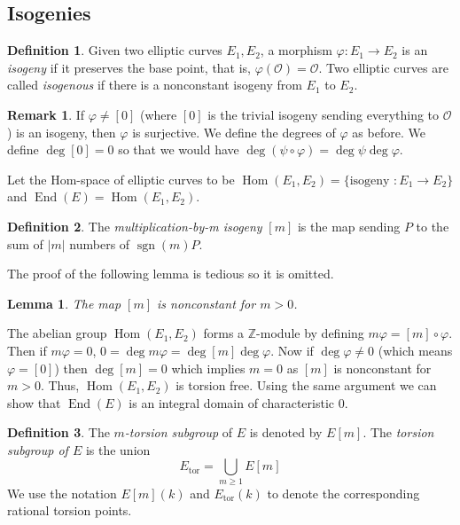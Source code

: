 \documentclass[12pt]{article}
\newtheorem{lemma}{Lemma}[subsection]
\theoremstyle{remark}
\theoremstyle{definition}
\newtheorem{remark}{Remark}[subsection]
\newtheorem{definition}{Definition}[subsection]
\newcommand{\Z}[0]{\mathbb{Z}}
\newcommand{\ecO}[0]{\mathcal O}
\newcommand{\sgn}[0]{\operatorname{sgn}}
\newcommand{\Hom}[0]{\operatorname{Hom}}
\newcommand{\End}[0]{\operatorname{End}}
\begin{document}
        \subsection{Isogenies}    
        \begin{definition}
            Given two elliptic curves $E_1,E_2$, a morphism $\varphi:E_1\to E_2$ is an \textit{isogeny} if it preserves the base point, that is, $\varphi(\ecO)=\ecO$. Two elliptic curves are called \textit{isogenous} if there is a nonconstant isogeny from $E_1$ to $E_2$.
        \end{definition}
        \begin{remark}
            If $\varphi\neq[0]$ (where $[0]$ is the trivial isogeny sending everything to $\ecO$) is an isogeny, then $\varphi$ is surjective. We define the degrees of $\varphi$ as before. We define $\deg[0]=0$ so that we would have $\deg(\psi\circ\varphi)=\deg\psi\deg\varphi$.
        \end{remark}
        Let the Hom-space of elliptic curves to be $\Hom(E_1,E_2)=\{\text{isogeny }:E_1\to E_2\}$ and $\operatorname{End}(E)=\Hom(E_1,E_2)$.
        \begin{definition}
            The \textit{multiplication-by-m isogeny} $[m]$ is the map sending $P$ to the sum of $|m|$ numbers of $\sgn(m)P$.
        \end{definition}
        The proof of the following lemma is tedious so it is omitted.
        \begin{lemma}
            The map $[m]$ is nonconstant for $m>0$.
        \end{lemma}
        The abelian group $\Hom(E_1, E_2)$ forms a $\Z$-module by defining $m\varphi=[m]\circ\varphi$. Then if $m\varphi=0$, $0=\deg m\varphi=\deg[m]\deg\varphi$. Now if $\deg\varphi\neq 0$ (which means $\varphi=[0]$) then $\deg[m]=0$ which implies $m=0$ as $[m]$ is nonconstant for $m>0$. Thus, $\Hom(E_1,E_2)$ is torsion free. Using the same argument we can show that $\End(E)$ is an integral domain of characteristic $0$.
        \begin{definition}
            The \textit{$m$-torsion subgroup} of $E$ is denoted by $E[m]$. The \textit{torsion subgroup of $E$} is the union
            \[E_{\text{tor}}=\bigcup_{m\geqslant 1}E[m]\]
            We use the notation $E[m](k)$ and $E_{\text{tor}}(k)$ to denote the corresponding rational torsion points.
        \end{definition}
\end{document}

